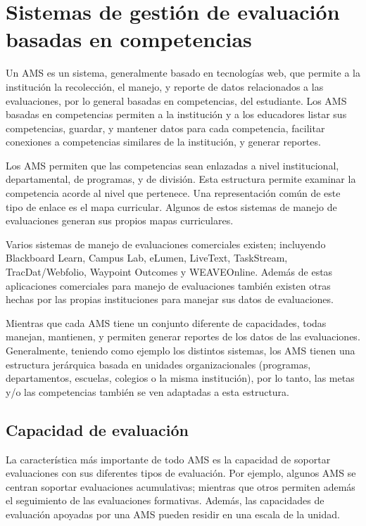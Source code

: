 \section{Sistemas de gestión de evaluación basadas en competencias}
Un AMS es un sistema, generalmente basado en tecnologías web, que permite a la institución la recolección, el manejo, y reporte de datos relacionados a las evaluaciones, por lo general basadas en competencias, del estudiante. Los AMS basadas en competencias permiten a la institución y a los educadores listar sus competencias, guardar, y mantener datos para cada competencia, facilitar conexiones a competencias similares de la institución, y generar reportes\citep{cartwright2009student}.

Los AMS permiten que las competencias sean enlazadas a nivel institucional, departamental, de programas, y de división. Esta estructura permite examinar la competencia
acorde al nivel que pertenece. Una representación común de este tipo de enlace es el mapa curricular\citep{oakleaf_choosing_2013}. Algunos de estos sistemas de manejo de evaluaciones generan sus propios mapas curriculares.

Varios sistemas de manejo de evaluaciones comerciales existen; incluyendo Blackboard Learn, Campus Lab, eLumen, LiveText, TaskStream, TracDat/Webfolio, Waypoint Outcomes y WEAVEOnline. Además de estas aplicaciones comerciales para manejo de evaluaciones también existen otras hechas por las propias instituciones para manejar sus datos de evaluaciones.

Mientras que cada AMS tiene un conjunto diferente de capacidades, todas manejan, mantienen, y permiten generar reportes de los datos de las evaluaciones. Generalmente, teniendo como ejemplo los distintos sistemas, los AMS tienen una estructura jerárquica basada en unidades organizacionales (programas, departamentos, escuelas, colegios o la misma institución), por lo tanto, las metas y/o las competencias también se ven adaptadas a esta estructura.

\subsection{Capacidad de evaluación}
La característica más importante de todo AMS es la capacidad de soportar evaluaciones con sus diferentes tipos de evaluación. Por ejemplo, algunos AMS se centran soportar evaluaciones acumulativas; mientras que otros permiten además el seguimiento de las evaluaciones formativas. Además, las capacidades de evaluación apoyadas por una AMS pueden residir en una escala de la unidad.

